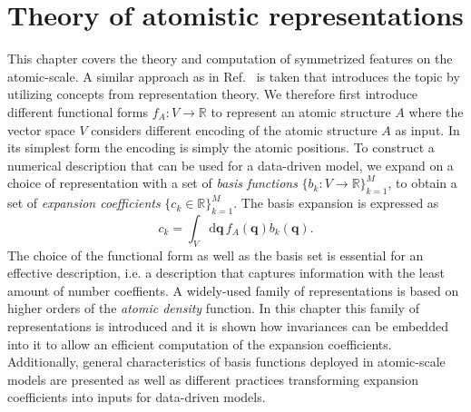 \chapter{Theory of atomistic representations}
\label{sec:atomistic_representation}

This chapter covers the theory and computation of symmetrized features on the atomic-scale.
A similar approach as in Ref.~\cite{will+19jcp} is taken that introduces the topic by utilizing concepts from representation theory.
We therefore first introduce different functional forms $f_A:V\rightarrow\mathbb{R}$ to represent an atomic structure $A$ where the vector space $V$ considers different encoding of the atomic structure $A$ as input. In its simplest form the encoding is simply the atomic positions.
To construct a numerical description that can be used for a data-driven model, we expand on a choice of representation with a set of \emph{basis functions} $\{b_k:V\rightarrow\mathbb{R}\}_{k=1}^{M}$, to obtain a set of \emph{expansion coefficients} $\{c_k\in\mathbb{R}\}_{k=1}^{M}$.
The basis expansion is expressed as
\begin{equation}
  c_k = \int_V\mathrm{d}\mathbf{q}\, f_A(\mathbf{q})b_k(\mathbf{q}).
\end{equation}
The choice of the functional form as well as the basis set is essential for an effective description, i.e. a description that captures information with the least amount of number coeffients. 
A widely-used family of representations is based on higher orders of the \emph{atomic density} function.
In this chapter this family of representations is introduced and it is shown how invariances can be embedded into it to allow an efficient computation of the expansion coefficients.
Additionally, general characteristics of basis functions deployed in atomic-scale models are presented as well as different practices transforming expansion coefficients into inputs for data-driven models.
 
